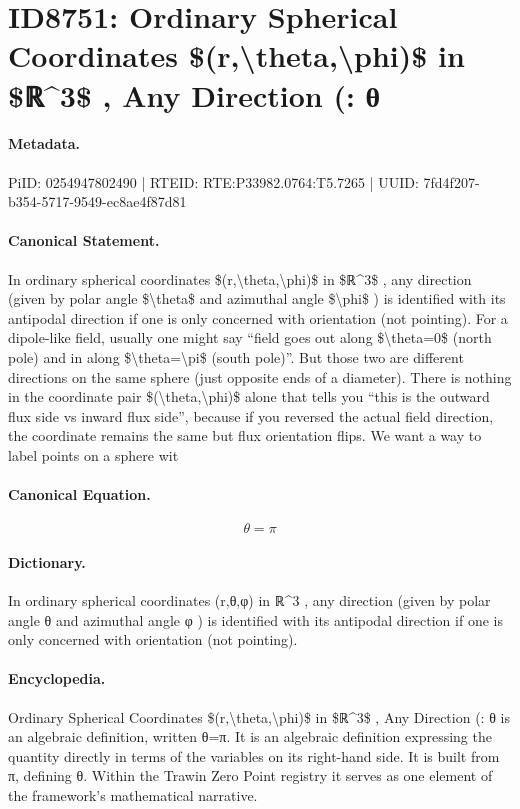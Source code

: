\section*{ID8751: Ordinary Spherical Coordinates \$(r,\textbackslash{}theta,\textbackslash{}phi)\$ in \$ℝ\textasciicircum{}3\$ , Any Direction (: θ}
\paragraph{Metadata.}
PiID: 0254947802490 | RTEID: RTE:P33982.0764:T5.7265 | UUID: 7fd4f207-b354-5717-9549-ec8ae4f87d81

\paragraph{Canonical Statement.}
In ordinary spherical coordinates \$(r,\textbackslash{}theta,\textbackslash{}phi)\$ in \$ℝ\textasciicircum{}3\$ , any direction (given by polar angle \$\textbackslash{}theta\$ and azimuthal angle \$\textbackslash{}phi\$ ) is identified with its antipodal direction if one is only concerned with orientation (not pointing). For a dipole-like field, usually one might say “field goes out along \$\textbackslash{}theta=0\$ (north pole) and in along \$\textbackslash{}theta=\textbackslash{}pi\$ (south pole)”. But those two are different directions on the same sphere (just opposite ends of a diameter). There is nothing in the coordinate pair \$(\textbackslash{}theta,\textbackslash{}phi)\$ alone that tells you “this is the outward flux side vs inward flux side”, because if you reversed the actual field direction, the coordinate remains the same but flux orientation flips. We want a way to label points on a sphere wit

\paragraph{Canonical Equation.}
\[
\theta=\pi
\]

\paragraph{Dictionary.}
In ordinary spherical coordinates (r,θ,φ) in ℝ\textasciicircum{}3 , any direction (given by polar angle θ and azimuthal angle φ ) is identified with its antipodal direction if one is only concerned with orientation (not pointing).

\paragraph{Encyclopedia.}
Ordinary Spherical Coordinates \$(r,\textbackslash{}theta,\textbackslash{}phi)\$ in \$ℝ\textasciicircum{}3\$ , Any Direction (: θ is an algebraic definition, written θ=π. It is an algebraic definition expressing the quantity directly in terms of the variables on its right-hand side. It is built from π, defining θ. Within the Trawin Zero Point registry it serves as one element of the framework's mathematical narrative.
